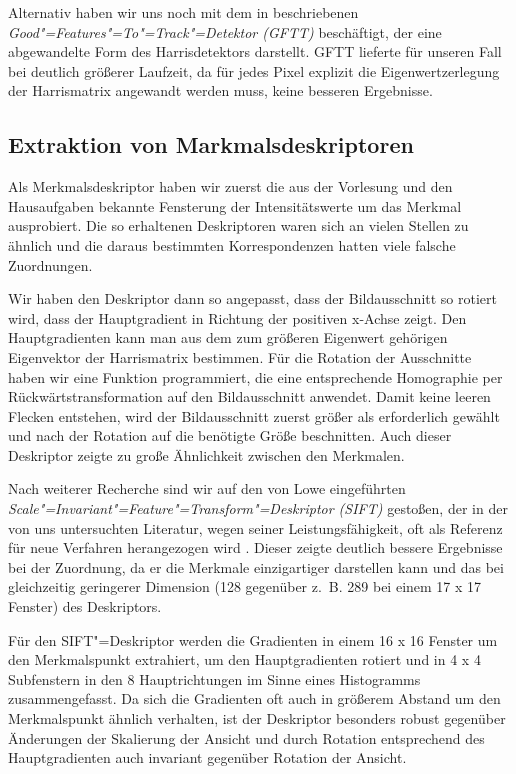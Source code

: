 Alternativ haben wir uns noch mit dem in \cite[S. 9]{Riegler} beschriebenen \textit{Good"=Features"=To"=Track"=Detektor (GFTT)} beschäftigt, der eine abgewandelte Form des Harrisdetektors darstellt. GFTT lieferte für unseren Fall bei deutlich größerer Laufzeit, da für jedes Pixel explizit die Eigenwertzerlegung der Harrismatrix angewandt werden muss, keine besseren Ergebnisse.

\subsection{Extraktion von Markmalsdeskriptoren}
Als Merkmalsdeskriptor haben wir zuerst die aus der Vorlesung und den Hausaufgaben bekannte Fensterung der Intensitätswerte um das Merkmal ausprobiert. Die so erhaltenen Deskriptoren waren sich an vielen Stellen zu ähnlich und die daraus bestimmten Korrespondenzen hatten viele falsche Zuordnungen.

Wir haben den Deskriptor dann so angepasst, dass der Bildausschnitt so rotiert wird, dass der Hauptgradient in Richtung der positiven x-Achse zeigt. Den Hauptgradienten kann man aus dem zum größeren Eigenwert gehörigen Eigenvektor der Harrismatrix bestimmen. Für die Rotation der Ausschnitte haben wir eine Funktion programmiert, die eine entsprechende Homographie per Rückwärtstransformation auf den Bildausschnitt anwendet. Damit keine leeren Flecken entstehen, wird der Bildausschnitt zuerst größer als erforderlich gewählt und nach der Rotation auf die benötigte Größe beschnitten. Auch dieser Deskriptor zeigte zu große Ähnlichkeit zwischen den Merkmalen.

Nach weiterer Recherche sind wir auf den von Lowe eingeführten \textit{Scale"=Invariant"=Feature"=Transform"=Deskriptor (SIFT)} gestoßen, der in der von uns untersuchten Literatur, wegen seiner Leistungsfähigkeit, oft als Referenz für neue Verfahren herangezogen wird \cite{Hast} \cite{Lowe} \cite{Rao}. Dieser zeigte deutlich bessere Ergebnisse bei der Zuordnung, da er die Merkmale einzigartiger darstellen kann und das bei gleichzeitig geringerer Dimension (128 gegenüber z.~B. 289 bei einem 17 x 17 Fenster) des Deskriptors.

Für den SIFT"=Deskriptor werden die Gradienten in einem 16 x 16 Fenster um den Merkmalspunkt extrahiert, um den Hauptgradienten rotiert und in 4 x 4 Subfenstern in den 8 Hauptrichtungen im Sinne eines Histogramms zusammengefasst. Da sich die Gradienten oft auch in größerem Abstand um den Merkmalspunkt ähnlich verhalten, ist der Deskriptor besonders robust gegenüber Änderungen der Skalierung der Ansicht und durch Rotation entsprechend des Hauptgradienten auch invariant gegenüber Rotation der Ansicht.

